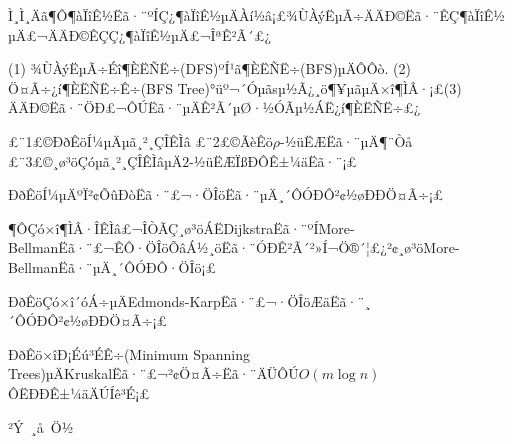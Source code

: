 Ì¸Ì¸Äã¶Ô¶àÏîÊ½Ëã·¨ºÍÇ¿¶àÏîÊ½µÄÀí½â¡£¾ÙÀýËµÃ÷ÄÄÐ©Ëã·¨ÊÇ¶àÏîÊ½µÄ£¬ÄÄÐ©ÊÇÇ¿¶àÏîÊ½µÄ£¬ÎªÊ²Ã´£¿






\newpage
{}
(1) ¾ÙÀýËµÃ÷Éî¶ÈËÑË÷(DFS)ºÍ¹ã¶ÈËÑË÷(BFS)µÄÔ­Ôò. (2) Ö¤Ã÷¿í¶ÈËÑË÷Ê÷(BFS Tree)°üº¬´Óµãsµ½Ã¿¸ö¶¥µãµÄ×î¶ÌÂ·¡£(3) ÄÄÐ©Ëã·¨ÖÐ£¬ÔÚËã·¨µÄÊ²Ã´µØ·½ÓÃµ½ÁË¿í¶ÈËÑË÷£¿






\newpage
£¨1£©ÐðÊöÍ¼µÄµã¸²¸ÇÎÊÌâ £¨2£©ÃèÊö$\rho$-½üËÆËã·¨µÄ¶¨Òå £¨3£©¸ø³öÇóµã¸²¸ÇÎÊÌâµÄ$2$-½üËÆÏßÐÔÊ±¼äËã·¨¡£


\newpage
{}
ÐðÊöÍ¼µÄºÏ²¢ÕûÐòËã·¨£¬·ÖÎöËã·¨µÄ¸´ÔÓÐÔ²¢½øÐÐÖ¤Ã÷¡£


\newpage
{}
¶ÔÇó×î¶ÌÂ·ÎÊÌâ£¬ÎÒÃÇ¸ø³öÁËDijkstraËã·¨ºÍMore-BellmanËã·¨£¬ÊÔ·ÖÎöÕâÁ½¸öËã·¨ÓÐÊ²Ã´²»Í¬Ö®´¦£¿²¢¸ø³öMore-BellmanËã·¨µÄ¸´ÔÓÐÔ·ÖÎö¡£



\newpage
{}
ÐðÊöÇó×î´óÁ÷µÄEdmonds-KarpËã·¨£¬·ÖÎöÆäËã·¨¸´ÔÓÐÔ²¢½øÐÐÖ¤Ã÷¡£

\newpage
{}ÐðÊö×îÐ¡Éú³ÉÊ÷(Minimum Spanning Trees)µÄKruskalËã·¨£¬²¢Ö¤Ã÷Ëã·¨ÄÜÔÚ$O(m\log n)$ÔËÐÐÊ±¼äÄÚÍê³É¡£





\begin{center}
{\kaishu}
\end{center}

\newpage
\begin{center}
{\kaishu ²Ý~¸å~Ö½}
\end{center}


\lastpg





